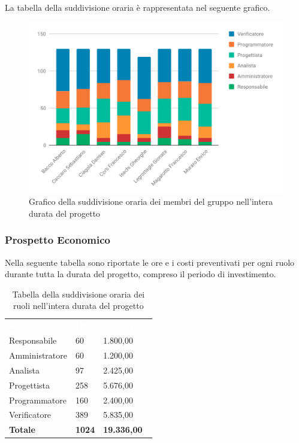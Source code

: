 La tabella della suddivisione oraria è rappresentata nel seguente grafico.
\begin{figure}[H]
\centering
	\includegraphics[width=.9\linewidth]{Preventivo/grafici/TI1_1.pdf}
	\caption{Grafico della suddivisione oraria dei membri del gruppo nell'intera durata del progetto}
\end{figure}

\subsubsection{Prospetto Economico}
Nella seguente tabella sono riportate le ore e i costi preventivati per ogni ruolo durante tutta la durata del progetto, compreso il periodo di investimento.


\begin{table}[H]	
	\begin{center}
	    \begin{tabular}{C{4cm}C{1cm}C{3,5cm}}
			\textcolor{white}{\textbf{Ruolo}} & \textcolor{white}{\textbf{Ore}} & \textcolor{white}{\textbf{Costo in €}}
			\\
			Responsabile & 60 & 1.800,00 \\
			Amministratore & 60 & 1.200,00 \\
			Analista & 97 & 2.425,00 \\
			Progettista & 258 & 5.676,00 \\
			Programmatore & 160 & 2.400,00 \\
			Verificatore & 389 & 5.835,00 \\
			\textbf{Totale} & \textbf{1024} & \textbf{19.336,00} \\

		\end{tabular}
	    \caption{Tabella della suddivisione oraria dei ruoli nell'intera durata del progetto} \label{tab:tabellaRuoliProgInt} 
	\end{center}
\end{table}


